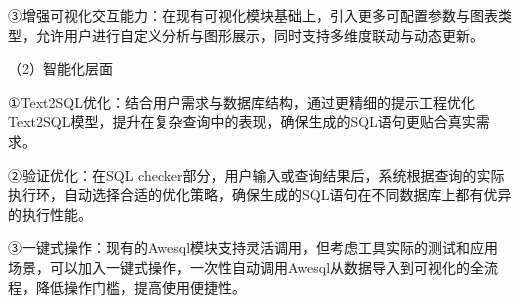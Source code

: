 \begin{CJK*}{UTF8}{song}
③增强可视化交互能力：在现有可视化模块基础上，引入更多可配置参数与图表类型，允许用户进行自定义分析与图形展示，同时支持多维度联动与动态更新。


（2）智能化层面


①Text2SQL优化：结合用户需求与数据库结构，通过更精细的提示工程优化Text2SQL模型，提升在复杂查询中的表现，确保生成的SQL语句更贴合真实需求。

②验证优化：在SQL checker部分，用户输入或查询结果后，系统根据查询的实际执行环，自动选择合适的优化策略，确保生成的SQL语句在不同数据库上都有优异的执行性能。

③一键式操作：现有的Awesql模块支持灵活调用，但考虑工具实际的测试和应用场景，可以加入一键式操作，一次性自动调用Awesql从数据导入到可视化的全流程，降低操作门槛，提高使用便捷性。


\end{CJK*}